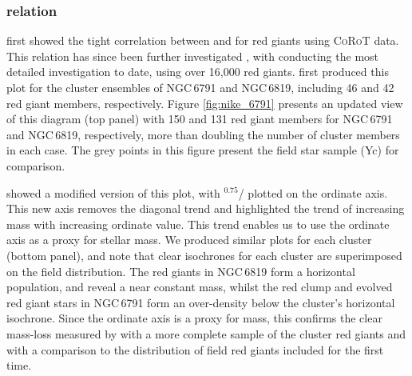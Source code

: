 \subsubsection{\numax{} \textendash \dnu{} relation}

\cite{hekker_characteristics_2009} first showed the tight correlation between \dnu{} and \numax{} for red giants using \textsc{CoRoT} data. This relation has since been further investigated \cite[eg.][]{stello_relation_2009, huber_testing_2011}, with \cite{yu_asteroseismology_2018-1} conducting the most detailed investigation to date, using over 16,000 red giants. \cite{ hekker_asteroseismic_2011} first produced this plot for the cluster ensembles of NGC\,6791 and NGC\,6819, including 46 and 42 red giant members, respectively. Figure \ref{fig:nike_6791} presents an updated view of this diagram (top panel) with 150 and 131 red giant members for NGC\,6791 and NGC\,6819, respectively, more than doubling the number of cluster members in each case. The grey points in this figure present the field star sample (Yc) for comparison. 

\cite{yu_asteroseismology_2018-1} showed a modified version of this plot, with \numax{}$^{0.75}$/\dnu{} plotted on the ordinate axis. This new axis removes the diagonal trend and highlighted the trend of increasing mass with increasing ordinate value. This trend enables us to use the ordinate axis as a proxy for stellar mass. We produced similar plots for each cluster (bottom panel), and note that clear isochrones for each cluster are superimposed on the field distribution. The red giants in NGC\,6819 form a horizontal population, and reveal a near constant mass, whilst the red clump and evolved red giant stars in NGC\,6791 form an over-density below the cluster's horizontal isochrone. Since the ordinate axis is a proxy for mass, this confirms the clear mass-loss measured by \cite{miglio_asteroseismology_2012} with a more complete sample of the cluster red giants and with a comparison to the distribution of field red giants included for the first time.

